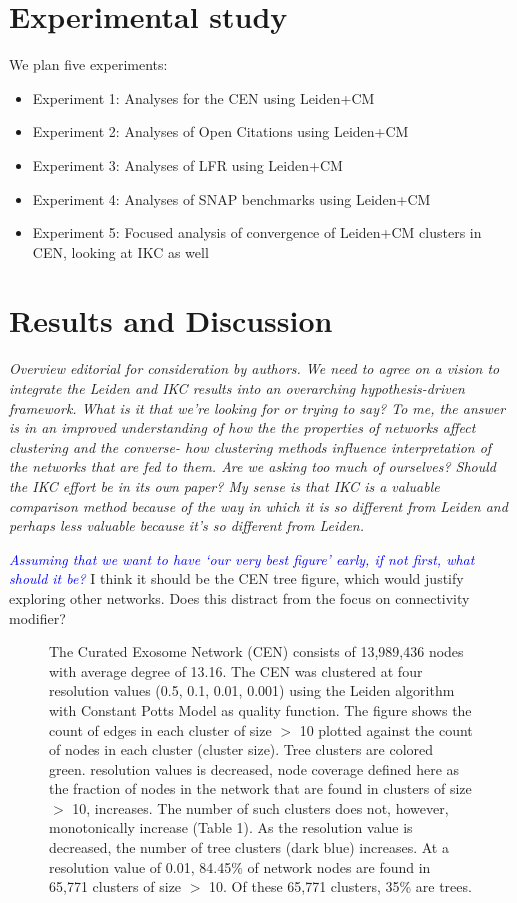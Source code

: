 \documentclass[12pt, oneside]{article}   	%
\begin{document}
\section{Experimental study}
We plan five experiments:

\begin{itemize}
\item Experiment 1: Analyses  for the CEN using Leiden+CM
\item Experiment 2: Analyses of Open Citations using Leiden+CM
\item Experiment 3: Analyses of LFR using Leiden+CM
\item Experiment 4: Analyses of SNAP benchmarks using Leiden+CM
\item Experiment 5: Focused analysis of convergence of Leiden+CM clusters in CEN, looking at IKC as well
\end{itemize}


\section{Results and Discussion}

\emph{Overview editorial for consideration by authors. We need to agree on a vision to integrate the Leiden and IKC results into an overarching hypothesis-driven framework. What is it that we're looking for or trying to say? To me, the answer is in an improved understanding of how the the properties of networks affect clustering and the converse- how clustering methods influence interpretation of the networks that are fed to them. Are we asking too much of ourselves? Should the IKC effort be in its own paper? My sense is that IKC is a valuable comparison method because of the way in which it is so different from Leiden and perhaps less valuable because it's so different from Leiden.}

\textcolor{blue}{\emph{Assuming that we want to have `our very best figure' early, if not first, what should it be?}} I think it should be the CEN tree figure, which would justify exploring other networks.  Does this distract from the focus on connectivity modifier?

\begin{figure}[H]
\centering

\caption{The Curated Exosome Network (CEN) consists of 13,989,436 nodes with average degree of 13.16. The CEN was clustered at four resolution values (0.5, 0.1, 0.01, 0.001) using the Leiden algorithm with Constant Potts Model as quality function. The figure shows the count of edges in each cluster of size $>$  10 plotted against the count of nodes in each cluster (cluster size). Tree clusters are colored green.  resolution values is decreased, node coverage defined here as the fraction of nodes in the network that are found in clusters of size $>$  10, increases. The number of such clusters does not, however, monotonically increase (Table 1). As the resolution value is decreased, the number of tree clusters (dark blue) increases. At a resolution value of 0.01, 84.45\% of network nodes are found in 65,771 clusters of size $>$ 10. Of these 65,771 clusters, 35\% are trees.}
\end{figure}
\end{document}

